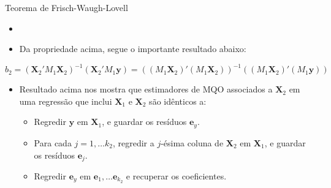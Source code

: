 \documentclass[11pt]{beamer}
\begin{document}
\begin{frame}{Teorema de Frisch-Waugh-Lovell}
\begin{itemize}
	\item 	\item Da propriedade acima, segue o importante resultado abaixo:
\end{itemize}
	\begin{theorem}
	$$\hat{b}_2 = \left(\boldsymbol{X}_2'M_1\boldsymbol{X}_2\right)^{-1}\left(\boldsymbol{X}_2'M_1\boldsymbol{y}\right) = \left((M_1\boldsymbol{X}_2)'(M_1\boldsymbol{X}_2)\right)^{-1}\left((M_1\boldsymbol{X}_2)'(M_1\boldsymbol{y})\right) $$ 
	\end{theorem}
\begin{itemize}
	\item Resultado acima nos mostra que estimadores de MQO associados a $\boldsymbol{X}_2$ em uma regressão que inclui $\boldsymbol{X}_1$ e $\boldsymbol{X}_2$ são idênticos a:
	\begin{itemize}
		\item Regredir $\boldsymbol{y}$ em $\boldsymbol{X}_1$, e guardar os resíduos $\boldsymbol{e}_y$.
		\item Para cada $j=1,\ldots k_2$, regredir a $j$-ésima coluna de $\boldsymbol{X}_2$ em $\boldsymbol{X}_1$, e guardar os resíduos ${\boldsymbol{e}_j}$.
		\item Regredir $\boldsymbol{e}_y$ em $\boldsymbol{e}_1,\ldots \boldsymbol{e}_{k_2}$ e recuperar os coeficientes.
	\end{itemize}
\end{itemize}
\end{frame}
\end{document}
